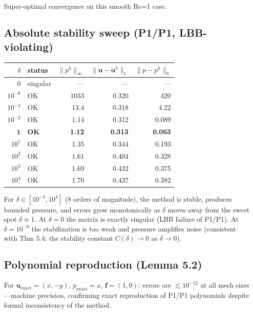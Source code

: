 \documentclass[11pt]{article}
\begin{document}
Super-optimal convergence on this smooth Re=1 case.

\subsection{Absolute stability sweep (P1/P1, LBB-violating)}

\begin{table}[h]
\centering\small
\begin{tabular}{@{}rlrrr@{}}
\toprule
$\delta$ & status & $\|p^h\|_\infty$ & $\|\mathbf{u}{-}\mathbf{u}^h\|_1$ & $\|p{-}p^h\|_0$ \\
\midrule
0         & singular & --- & --- & --- \\
$10^{-6}$ & OK & 1033  & 0.320 & 420 \\
$10^{-4}$ & OK & 13.4  & 0.318 & 4.22 \\
$10^{-2}$ & OK & 1.14  & 0.312 & 0.089 \\
$\mathbf{1}$ & \textbf{OK} & \textbf{1.12} & \textbf{0.313} & \textbf{0.063} \\
$10^{1}$  & OK & 1.35  & 0.344 & 0.193 \\
$10^{2}$  & OK & 1.61  & 0.404 & 0.328 \\
$10^{3}$  & OK & 1.69  & 0.432 & 0.375 \\
$10^{4}$  & OK & 1.70  & 0.437 & 0.382 \\
\bottomrule
\end{tabular}
\end{table}

For $\delta \in [10^{-4}, 10^4]$ (8 orders of magnitude), the method is stable, produces bounded pressure, and errors grow monotonically as $\delta$ moves away from the sweet spot $\delta \approx 1$. At $\delta = 0$ the matrix is exactly singular (LBB failure of P1/P1). At $\delta = 10^{-6}$ the stabilization is too weak and pressure amplifies noise (consistent with Thm 5.4: the stability constant $C(\delta) \to 0$ as $\delta \to 0$).

\subsection{Polynomial reproduction (Lemma 5.2)}

For $\mathbf{u}_\text{exact} = (x, -y)$, $p_\text{exact} = x$, $\mathbf{f} = (1, 0)$: errors are $\lesssim 10^{-12}$ at all mesh sizes---machine precision, confirming exact reproduction of P1/P1 polynomials despite formal inconsistency of the method.
\end{document}

